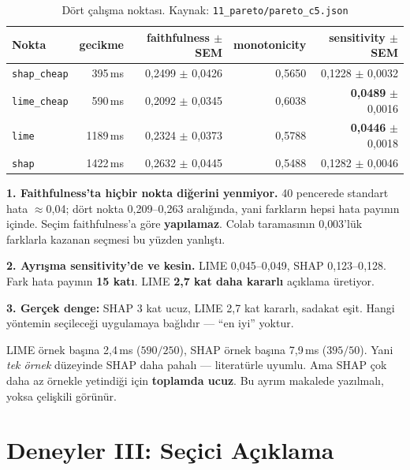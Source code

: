 \documentclass[11pt,a4paper]{report}
\newcommand{\ms}{\,ms}
\newcommand{\kod}[1]{\texttt{\small #1}}
\newcommand{\dosya}[1]{\texttt{\footnotesize #1}}
\begin{document}
\begin{table}[H]
\centering\small
\begin{tabular}{@{}lrrrr@{}}
\toprule
\textbf{Nokta} & \textbf{gecikme} & \textbf{faithfulness $\pm$ SEM} & \textbf{monotonicity} & \textbf{sensitivity $\pm$ SEM} \\
\midrule
\kod{shap\_cheap} & 395\ms  & 0{,}2499 $\pm$ 0{,}0426 & 0{,}5650 & 0{,}1228 $\pm$ 0{,}0032 \\
\kod{lime\_cheap} & 590\ms  & 0{,}2092 $\pm$ 0{,}0345 & 0{,}6038 & \textbf{0{,}0489} $\pm$ 0{,}0016 \\
\kod{lime}        & 1189\ms & 0{,}2324 $\pm$ 0{,}0373 & 0{,}5788 & \textbf{0{,}0446} $\pm$ 0{,}0018 \\
\kod{shap}        & 1422\ms & 0{,}2632 $\pm$ 0{,}0445 & 0{,}5488 & 0{,}1282 $\pm$ 0{,}0046 \\
\bottomrule
\end{tabular}
\caption{Dört çalışma noktası. Kaynak: \dosya{11\_pareto/pareto\_c5.json}}
\label{tab:pareto}
\end{table}

\begin{bulgu}[Üç sonuç]
\textbf{1. Faithfulness'ta hiçbir nokta diğerini yenmiyor.} 40 pencerede
standart hata $\approx$0{,}04; dört nokta 0{,}209--0{,}263 aralığında, yani
farkların hepsi hata payının içinde. Seçim faithfulness'a göre
\textbf{yapılamaz}. Colab taramasının 0{,}003'lük farklarla kazanan seçmesi bu
yüzden yanlıştı.

\textbf{2. Ayrışma sensitivity'de ve kesin.} LIME 0{,}045--0{,}049, SHAP
0{,}123--0{,}128. Fark hata payının \textbf{15 katı}. LIME \textbf{2{,}7 kat
daha kararlı} açıklama üretiyor.

\textbf{3. Gerçek denge:} SHAP 3 kat ucuz, LIME 2{,}7 kat kararlı, sadakat eşit.
Hangi yöntemin seçileceği uygulamaya bağlıdır --- ``en iyi'' yoktur.
\end{bulgu}

\begin{uyari}
LIME örnek başına 2{,}4\ms{} ($590/250$), SHAP örnek başına 7{,}9\ms{}
($395/50$). Yani \emph{tek örnek} düzeyinde SHAP daha pahalı --- literatürle
uyumlu. Ama SHAP çok daha az örnekle yetindiği için \textbf{toplamda ucuz}.
Bu ayrım makalede yazılmalı, yoksa çelişkili görünür.
\end{uyari}

\chapter{Deneyler III: Seçici Açıklama}
\end{document}

